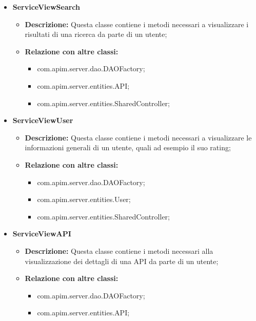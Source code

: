{{{{\begin{itemize}
\begin{itemize}
\begin{itemize}
            \end{itemize}
          \end{itemize}
          \item \textbf{ServiceViewSearch}
          \begin{itemize}
            \item \textbf{Descrizione:} Questa classe contiene i metodi necessari a visualizzare i risultati di una ricerca da parte di un utente;
            \item \textbf{Relazione con altre classi:}
            \begin{itemize}
              \item com.apim.server.dao.DAOFactory;
              \item com.apim.server.entities.API;
              \item com.apim.server.entities.SharedController;
            \end{itemize}
          \end{itemize}
          \item \textbf{ServiceViewUser}
          \begin{itemize}
            \item \textbf{Descrizione:} Questa classe contiene i metodi necessari a visualizzare le informazioni generali di un utente, quali ad esempio il suo rating;
            \item \textbf{Relazione con altre classi:}
            \begin{itemize}
              \item com.apim.server.dao.DAOFactory;
              \item com.apim.server.entities.User;
              \item com.apim.server.entities.SharedController;
            \end{itemize}
          \end{itemize}
          \item \textbf{ServiceViewAPI}
          \begin{itemize}
            \item \textbf{Descrizione:} Questa classe contiene i metodi necessari alla visualizzazione dei dettagli di una API da parte di un utente;
            \item \textbf{Relazione con altre classi:}
            \begin{itemize}
              \item com.apim.server.dao.DAOFactory;
              \item com.apim.server.entities.API;

\end{itemize}
\end{itemize}
\end{itemize}}}}}
